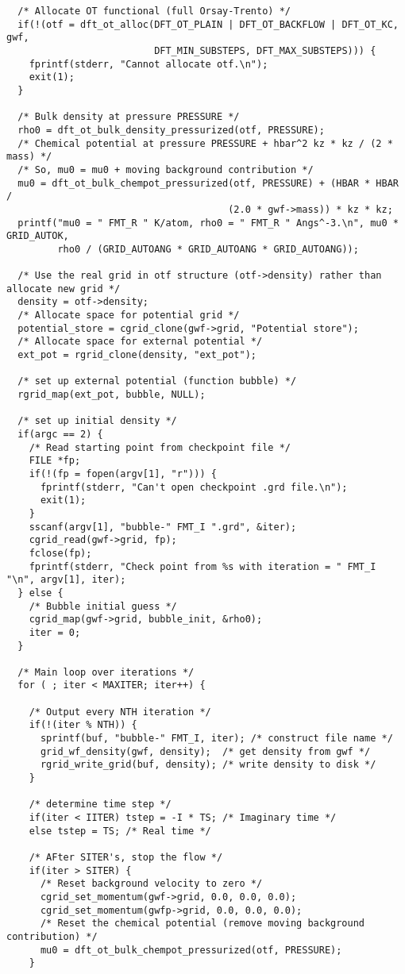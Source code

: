 \documentclass[12pt,letterpaper]{report}
\begin{document}
\begin{verbatim}
  /* Allocate OT functional (full Orsay-Trento) */
  if(!(otf = dft_ot_alloc(DFT_OT_PLAIN | DFT_OT_BACKFLOW | DFT_OT_KC, gwf,
                          DFT_MIN_SUBSTEPS, DFT_MAX_SUBSTEPS))) {
    fprintf(stderr, "Cannot allocate otf.\n");
    exit(1);
  }

  /* Bulk density at pressure PRESSURE */
  rho0 = dft_ot_bulk_density_pressurized(otf, PRESSURE);
  /* Chemical potential at pressure PRESSURE + hbar^2 kz * kz / (2 * mass) */
  /* So, mu0 = mu0 + moving background contribution */
  mu0 = dft_ot_bulk_chempot_pressurized(otf, PRESSURE) + (HBAR * HBAR / 
                                       (2.0 * gwf->mass)) * kz * kz;
  printf("mu0 = " FMT_R " K/atom, rho0 = " FMT_R " Angs^-3.\n", mu0 * GRID_AUTOK, 
         rho0 / (GRID_AUTOANG * GRID_AUTOANG * GRID_AUTOANG));

  /* Use the real grid in otf structure (otf->density) rather than allocate new grid */
  density = otf->density;
  /* Allocate space for potential grid */
  potential_store = cgrid_clone(gwf->grid, "Potential store");
  /* Allocate space for external potential */
  ext_pot = rgrid_clone(density, "ext_pot");

  /* set up external potential (function bubble) */
  rgrid_map(ext_pot, bubble, NULL);

  /* set up initial density */
  if(argc == 2) {
    /* Read starting point from checkpoint file */
    FILE *fp;
    if(!(fp = fopen(argv[1], "r"))) {
      fprintf(stderr, "Can't open checkpoint .grd file.\n");
      exit(1);
    }
    sscanf(argv[1], "bubble-" FMT_I ".grd", &iter);
    cgrid_read(gwf->grid, fp);
    fclose(fp);
    fprintf(stderr, "Check point from %s with iteration = " FMT_I "\n", argv[1], iter);
  } else {
    /* Bubble initial guess */
    cgrid_map(gwf->grid, bubble_init, &rho0);
    iter = 0;
  }

  /* Main loop over iterations */
  for ( ; iter < MAXITER; iter++) {

    /* Output every NTH iteration */
    if(!(iter % NTH)) {
      sprintf(buf, "bubble-" FMT_I, iter); /* construct file name */
      grid_wf_density(gwf, density);  /* get density from gwf */
      rgrid_write_grid(buf, density); /* write density to disk */
    }

    /* determine time step */
    if(iter < IITER) tstep = -I * TS; /* Imaginary time */
    else tstep = TS; /* Real time */

    /* AFter SITER's, stop the flow */
    if(iter > SITER) {
      /* Reset background velocity to zero */
      cgrid_set_momentum(gwf->grid, 0.0, 0.0, 0.0);
      cgrid_set_momentum(gwfp->grid, 0.0, 0.0, 0.0);
      /* Reset the chemical potential (remove moving background contribution) */
      mu0 = dft_ot_bulk_chempot_pressurized(otf, PRESSURE);
    }


\end{verbatim}
\end{document}
